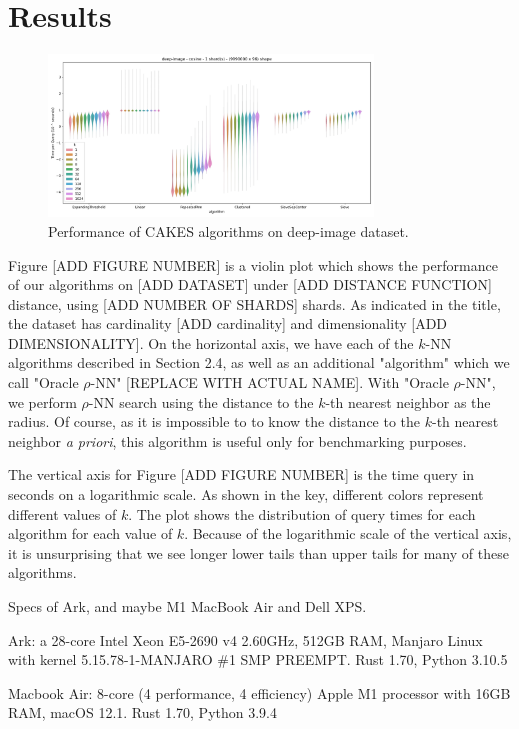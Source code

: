 \section{Results}
\label{sec:results}

\begin{figure}[ht!]
    \centering
    \includegraphics[width=3.4in]{images/result_plots/deep-image_1.png}
    \caption{Performance of CAKES algorithms on deep-image dataset.}
    \label{fig:methods:deep-image}
\end{figure}

Figure [ADD FIGURE NUMBER] is a violin plot which shows the performance of our algorithms
on [ADD DATASET] under [ADD DISTANCE FUNCTION] distance, using [ADD NUMBER OF SHARDS] shards.
As indicated in the title, the dataset has cardinality [ADD cardinality] and dimensionality [ADD DIMENSIONALITY].
On the horizontal axis, we have each of the $k$-NN algorithms described in Section 2.4, as well as  
an additional "algorithm" which we call "Oracle $\rho$-NN" [REPLACE WITH ACTUAL NAME].  With "Oracle $\rho$-NN", we perform $\rho$-NN search using the 
distance to the $k$-th nearest neighbor as the radius. Of course, as it is impossible to
to know the distance to the $k$-th nearest neighbor \emph{a priori}, this algorithm 
is useful only for benchmarking purposes.

The vertical axis for Figure [ADD FIGURE NUMBER] is the time query in seconds on a logarithmic scale. 
As shown in the key, different colors represent different values of $k$. 
The plot shows the distribution of query times for each algorithm for each value of $k$. 
Because of the logarithmic scale of the vertical axis, it is unsurprising that we 
see longer lower tails than upper tails for many of these algorithms. 

Specs of Ark, and maybe M1 MacBook Air and Dell XPS.

Ark: a 28-core Intel Xeon E5-2690 v4 2.60GHz, 512GB RAM, Manjaro Linux with kernel 5.15.78-1-MANJARO \#1 SMP PREEMPT. Rust 1.70, Python 3.10.5

Macbook Air: 8-core (4 performance, 4 efficiency) Apple M1 processor with 16GB RAM, macOS 12.1. Rust 1.70, Python 3.9.4

